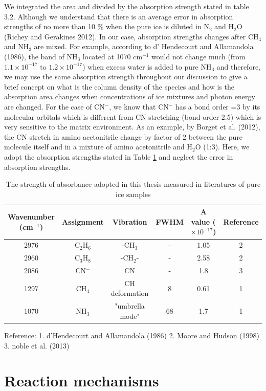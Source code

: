 We integrated the area and divided by the absorption strength stated in table 3.2. Although we understand that there is an average error in absorption strengths of no more than 10 \%  when the pure ice is diluted in N$_2$ and H$_2$O (Richey and Gerakines 2012). In our case, absorption strengths changes after CH$_4$ and NH$_3$ are mixed. For example, according to d' Hendecourt and Allamandola (1986), the band of NH$_3$ located at 1070 cm$^{-1}$ would not change much (from $1.1 \times 10^{-17}$ to $1.2 \times 10^{-17}$) when excess water is added to pure NH$_3$ and therefore, we may use the same absorption strength throughout our discussion to give a brief concept on what is the column density of the species and how is the absorption area changes when concentrations of ice mixtures and photon energy are changed. For the case of CN$^-$, we know that CN$^-$ has a bond order =3 by its molecular orbitals which is different from CN stretching (bond order 2.5) which is very sensitive to the matrix environment. As an example, by Borget et al. (2012), the CN stretch in amino acetonitrile change by factor of 2 between the pure molecule itself and in a mixture of amino acetonitrile and H$_2$O (1:3). Here, we adopt the absorption strengths stated in Table \ref{tab:Absorbance} and neglect the error in absorption strengths.\\

\begin{table}[htbp]
\caption{The strength of absorbance adopted in this thesis measured in literatures of pure ice samples}
\label{tab:Absorbance}
\begin{tabular}{cccccc}
\hline
\hline
Wavenumber (cm$^{-1}$) & Assignment  & Vibration & FWHM & A value ($\times 10^{-17}$) & Reference \\
\hline
2976 &  C$_2$H$_6$ & -CH$_3$ & - & 1.05 & 2 \\
2960 & C$_3$H$_8$ & -CH$_2$- & - & 2.58 & 2 \\
2086 & CN$^-$ & CN & - & 1.8 & 3 \\
1297 & CH$_4$ & CH deformation & 8 & 0.61 & 1 \\
1070 & NH$_3$ & "umbrella mode" & 68 & 1.7 & 1 \\
\hline
\end{tabular}
Reference: 1. d'Hendecourt and Allamandola (1986) 2. Moore and Hudson (1998) 3. noble et al. (2013)
\end{table}

\section{Reaction mechanisms}

